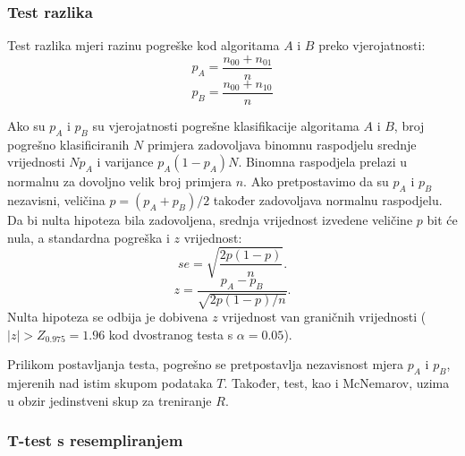 \subsubsection{Test razlika}

Test razlika  \citep{snedecor1980statistical} mjeri razinu pogreške kod algoritama $A$ i $B$ preko vjerojatnosti:
\begin{equation}
p_A = \frac{n_{00} + n_{01}}{n}
\end{equation}
\begin{equation}
p_B = \frac{n_{00} + n_{10}}{n}
\end{equation}

Ako su $p_A$ i $p_B$ su vjerojatnosti pogrešne klasifikacije algoritama $A$ i $B$, broj pogrešno klasificiranih $N$ primjera zadovoljava binomnu raspodjelu srednje vrijednosti $Np_A$ i varijance $p_A(1-p_A)N$. Binomna raspodjela prelazi u normalnu za dovoljno velik broj primjera $n$. Ako pretpostavimo da su $p_A$ i $p_B$ nezavisni, veličina $p=(p_A+p_B)/2$ također zadovoljava normalnu raspodjelu. Da bi nulta hipoteza bila zadovoljena, srednja vrijednost izvedene veličine $p$ bit će nula, a standardna pogreška i $z$ vrijednost:
\begin{equation}
se = \sqrt{\frac{2p(1-p)}{n}}.
\end{equation}
\begin{equation}
z = \frac{p_A-p_B}{\sqrt{2p(1-p)/n}}.
\end{equation}
Nulta hipoteza se odbija je dobivena $z$ vrijednost van graničnih vrijednosti ($|z| > Z_{0.975} = 1.96$ kod dvostranog testa s $\alpha=0.05$).

Prilikom postavljanja testa, pogrešno se pretpostavlja nezavisnost mjera $p_A$ i $p_B$, mjerenih nad istim skupom podataka $T$. Također, test, kao i McNemarov, uzima u obzir jedinstveni skup za treniranje $R$.	

\subsubsection{T-test s resempliranjem}

